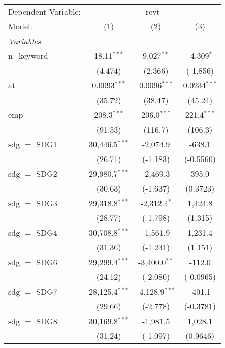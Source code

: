 
\begingroup
\centering
\begin{tabular}{lccc}
   \tabularnewline \midrule \midrule
   Dependent Variable: & \multicolumn{3}{c}{revt}\\
   Model:        & (1)              & (2)              & (3)\\  
   \midrule
   \emph{Variables}\\
   n\_keyword    & 18.11$^{***}$    & 9.027$^{**}$     & -4.309$^{*}$\\   
                 & (4.474)          & (2.366)          & (-1.856)\\   
   at            & 0.0093$^{***}$   & 0.0096$^{***}$   & 0.0234$^{***}$\\   
                 & (35.72)          & (38.47)          & (45.24)\\   
   emp           & 208.3$^{***}$    & 206.0$^{***}$    & 221.4$^{***}$\\   
                 & (91.53)          & (116.7)          & (106.3)\\   
   sdg $=$ SDG1  & 30,446.5$^{***}$ & -2,074.9         & -638.1\\   
                 & (26.71)          & (-1.183)         & (-0.5560)\\   
   sdg $=$ SDG2  & 29,980.7$^{***}$ & -2,469.3         & 395.0\\   
                 & (30.63)          & (-1.637)         & (0.3723)\\   
   sdg $=$ SDG3  & 29,318.8$^{***}$ & -2,312.4$^{*}$   & 1,424.8\\   
                 & (28.77)          & (-1.798)         & (1.315)\\   
   sdg $=$ SDG4  & 30,708.8$^{***}$ & -1,561.9         & 1,231.4\\   
                 & (31.36)          & (-1.231)         & (1.151)\\   
   sdg $=$ SDG6  & 29,299.4$^{***}$ & -3,400.0$^{**}$  & -112.0\\   
                 & (24.12)          & (-2.080)         & (-0.0965)\\   
   sdg $=$ SDG7  & 28,125.4$^{***}$ & -4,128.9$^{***}$ & -401.1\\   
                 & (29.66)          & (-2.778)         & (-0.3781)\\   
   sdg $=$ SDG8  & 30,169.8$^{***}$ & -1,981.5         & 1,028.1\\   
                 & (31.24)          & (-1.097)         & (0.9646)\\   

\end{tabular}
